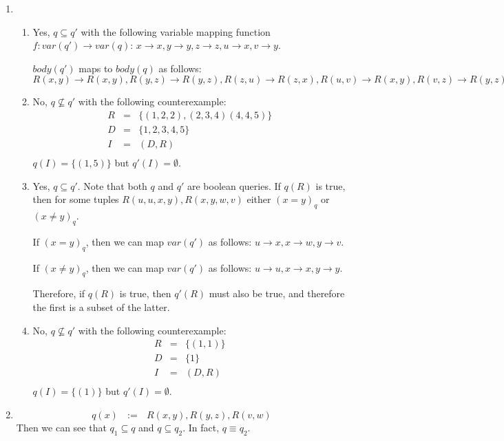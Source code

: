 \documentclass[12pt]{article}
\begin{document}
\begin{enumerate}
\item %
\begin{enumerate}
\item %
Yes, $q \subseteq q'$ with the following variable mapping function
$f: var(q') \rightarrow var(q)$:
$x \rightarrow x, y \rightarrow y, z \rightarrow z,
u \rightarrow x, v \rightarrow y$.

$body(q')$ maps to $body(q)$ as follows:
$R(x,y) \rightarrow R(x,y), R(y,z) \rightarrow R(y,z),
R(z,u) \rightarrow R(z,x), R(u,v) \rightarrow R(x,y),
R(v,z) \rightarrow R(y,z)$
%
\item %
No, $q \nsubseteq q'$ with the following counterexample:
%
\begin{eqnarray*}
R & = & \{(1,2,2), (2,3,4) (4,4,5)\}\\
D & = & \{1,2,3,4,5\}\\
I & = & (D, R)\\
\end{eqnarray*}
%
$q(I) = \{(1,5)\}$ but $q'(I) = \emptyset$.
%
\item %
Yes, $q \subseteq q'$. Note that both $q$ and $q'$ are boolean queries.
If $q(R)$ is true, then for some tuples $R(u,u,x,y),R(x,y,w,v)$ either
$(x=y)_q$ or $(x\ne y)_q$.

If $(x = y)_q$, then we can map $var(q')$ as follows: $u \rightarrow x,
x \rightarrow w, y \rightarrow v$.

If $(x \ne y)_q$, then we can map $var(q')$ as follows: $u \rightarrow u,
x \rightarrow x, y \rightarrow y$.

Therefore, if $q(R)$ is true, then $q'(R)$ must also be true, and therefore
the first is a subset of the latter.

\item %
%
No, $q \nsubseteq q'$ with the following counterexample:
%
\begin{eqnarray*}
R & = & \{(1,1)\}\\
D & = & \{1\}\\
I & = & (D, R)\\
\end{eqnarray*}
%
$q(I) = \{(1)\}$ but $q'(I) = \emptyset$.
%
\end{enumerate}
\item %
%
\begin{displaymath}
q(x) \textrm{ } := \textrm{ } R(x,y),R(y,z),R(v,w)
\end{displaymath}
%
Then we can see that $q_1 \subseteq q$ and $q \subseteq q_2$.
In fact, $q \equiv q_2$.


\end{enumerate}
\end{document}
